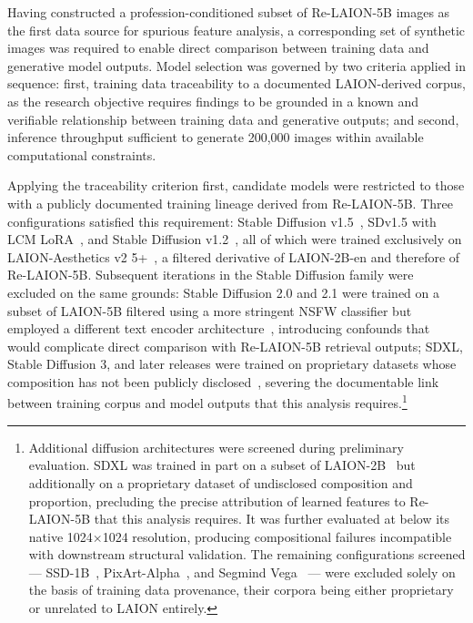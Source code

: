 Having constructed a profession-conditioned subset of Re-LAION-5B images
as the first data source for spurious feature analysis, a corresponding set
of synthetic images was required to enable direct comparison between
training data and generative model outputs. Model selection was governed by
two criteria applied in sequence: first, training data traceability to a
documented LAION-derived corpus, as the research objective requires findings
to be grounded in a known and verifiable relationship between training data
and generative outputs; and second, inference throughput sufficient to
generate 200{,}000 images within available computational constraints.

Applying the traceability criterion first, candidate models were restricted
to those with a publicly documented training lineage derived from
Re-LAION-5B. Three configurations satisfied this requirement: Stable
Diffusion v1.5~\cite{StableDiffusion_2022_SD15modelcard}, SDv1.5 with LCM
LoRA~\cite{StableDiffusion_2022_SD15modelcard, LCMLoRA_SDv15}, and Stable Diffusion
v1.2~\cite{StableDiffusion_2022_SD15modelcard}, all of which were trained exclusively on
LAION-Aesthetics v2 5+~\cite{Schuhmann_2022_LaionAesthetics}, a filtered
derivative of LAION-2B-en and therefore of Re-LAION-5B. Subsequent
iterations in the Stable Diffusion family were excluded on the same
grounds: Stable Diffusion 2.0 and 2.1 were trained on a subset of
LAION-5B filtered using a more stringent NSFW classifier but employed a
different text encoder architecture~\cite{Cherti_2023_OpenCLIP},
introducing confounds that would complicate direct comparison with
Re-LAION-5B retrieval outputs; SDXL, Stable Diffusion 3, and later
releases were trained on proprietary datasets whose composition has not
been publicly disclosed~\cite{Podell_2023_SDXL, Esser_2024_SD3},
severing the documentable link between training corpus and model outputs
that this analysis requires.\footnote{Additional diffusion architectures
	were screened during preliminary evaluation. SDXL was trained in part on
	a subset of LAION-2B~\cite{Podell_2023_SDXL} but additionally on a
	proprietary dataset of undisclosed composition and proportion, precluding
	the precise attribution of learned features to Re-LAION-5B that this
	analysis requires. It was further evaluated at below its native
	1024$\times$1024 resolution, producing compositional failures
	incompatible with downstream structural validation. The remaining
	configurations screened --- SSD-1B~\cite{SSD1B_ModelCard},
	PixArt-Alpha~\cite{PixArtAlpha_ModelCard}, and Segmind
	Vega~\cite{SegmindVega_ModelCard} --- were excluded solely on the basis
	of training data provenance, their corpora being either proprietary or
	unrelated to LAION entirely.}

